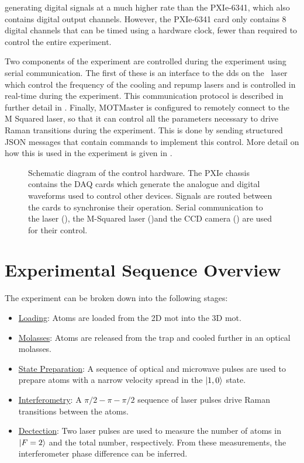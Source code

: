 generating digital signals at a much higher rate than the PXIe-6341, which
also contains digital output channels. However, the PXIe-6341 card only
contains 8 digital channels that can be timed using a hardware clock, fewer
than required to control the entire experiment.
\par\noindent
Two components of the experiment are controlled during the experiment using
serial communication. The first of these is an interface to the \ac{dds} on
the \Muquans\ laser which control the frequency of the cooling and repump
lasers and is controlled in real-time during the experiment. This
communication protocol is described in further detail in
. Finally, MOTMaster is configured to remotely connect to the M
Squared laser, so that it can control all the parameters necessary to drive
Raman transitions during the experiment. This is done by sending structured
JSON messages that contain commands to implement this control. More detail on how this is used in the experiment is given in
.
\begin{figure}[!htbp]
    \centering
    \fontsize{16pt}{14pt}
    \resizebox{1\textwidth}{!}{}
    \caption[Control hardware schematic diagram]{Schematic diagram of the control hardware. The PXIe chassis contains the DAQ cards which generate the analogue and digital waveforms used to control other devices. Signals are routed between the cards to synchronise their operation. Serial communication to the \Muquans laser (), the M-Squared laser ()and the CCD camera () are used for their control.}
    \label{fig:control_hardware}
\end{figure}

\section{Experimental Sequence Overview}
The experiment can be broken down into the following stages:
\begin{itemize}
    \item \underline{Loading}: Atoms are loaded from the 2D \ac{mot} into the 3D \ac{mot}.
    \item \underline{Molasses}: Atoms are released from the trap and cooled further in an optical molasses.
    \item \underline{State Preparation}: A sequence of optical and microwave pulses are used to prepare atoms with a narrow velocity spread in the \(\ket{1,0}\) state.
    \item \underline{Interferometry}: A \(\pi/2 - \pi - \pi/2\) sequence of laser pulses drive Raman transitions between the atoms.
    \item \underline{Dectection}: Two laser pulses are used to measure the number of atoms in \(\ket{F=2}\) and the total number, respectively. From these measurements, the interferometer phase difference can be inferred.
\end{itemize}
